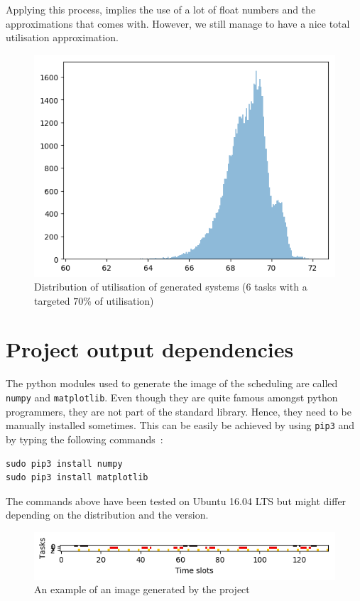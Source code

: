 \documentclass[a4paper,11pt]{article}
\begin{document}
  Applying this process, implies the use of a lot of float numbers and the approximations that comes with. However, we still manage to have a nice total utilisation approximation.
  \begin{figure}[h!]
    \centering
    \includegraphics[scale=0.7]{img/distribution.png}
    \caption{Distribution of utilisation of generated systems (6 tasks with a targeted $70\%$ of utilisation)}
  \end{figure}

\section{Project output dependencies}
  \label{sec:output-dependencies}
  The python modules used to generate the image of the scheduling are called \verb|numpy| and \verb|matplotlib|. Even though they are quite famous amongst python programmers, they are not part of the standard library. Hence, they need to be manually installed sometimes. This can be easily be achieved by using \verb|pip3| and by typing the following commands~:
  \begin{verbatim}
sudo pip3 install numpy
sudo pip3 install matplotlib
  \end{verbatim}
  The commands above have been tested on Ubuntu 16.04 LTS but might differ depending on the distribution and the version.
  \begin{figure}[ht!]
    \centering
    \includegraphics{img/schedule1.png}
    \caption{An example of an image generated by the project}
    \label{fig:scheduling-output-example}
  \end{figure}
\end{document}
